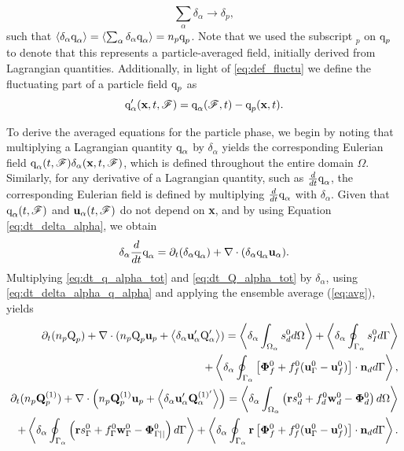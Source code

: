 \begin{equation*}
    \sum_\alpha \delta_\alpha \to \delta_p, 
\end{equation*}
such that $\left<\delta_\alpha \text q_\alpha\right>=\left<\sum_\alpha \delta_\alpha \text q_\alpha\right>=n_p\text q_p$.
Note that we used the subscript $_p$ on $\text q_p$ to denote that this represents a particle-averaged field, initially derived from Lagrangian quantities. 
Additionally, in light of \ref{eq:def_fluctu} we define the fluctuating part of a particle field $\text q_p$ as
\begin{equation}
    \text q_\alpha'(\textbf{x},t,\FF) = \text q_\alpha(\FF,t) - \text q_p(\textbf{x},t). 
    \label{eq:def_fluc_p}
\end{equation}

To derive the averaged equations for the particle phase, we begin by noting that multiplying a Lagrangian quantity $\text q_\alpha$ by $\delta_\alpha$ yields the corresponding Eulerian field  $\text q_\alpha(t,\mathscr{F})\delta_\alpha(\textbf{x},t,\mathscr{F})$, which is defined throughout the entire domain $\Omega$. 
Similarly, for any derivative of a Lagrangian quantity, such as $\frac{d}{dt} \text q_\alpha$, the corresponding Eulerian field is defined by multiplying $\frac{d}{dt} \text q_\alpha$ with $\delta_\alpha$.
Given that $\text q_\alpha(t,\mathscr{F})$ and $\textbf{u}_\alpha(t,\mathscr{F})$ do not depend on \textbf{x}, and by using Equation \ref{eq:dt_delta_alpha}, we obtain
\begin{equation}
    \delta_\alpha \ddt \text q_\alpha
    = \pddt (\delta_\alpha \text q_\alpha)
    + \div (\delta_\alpha \text q_\alpha \textbf{u}_\alpha).
    \label{eq:dt_delta_alpha_q_alpha}
\end{equation}
Multiplying \ref{eq:dt_q_alpha_tot} and \ref{eq:dt_Q_alpha_tot} by $\delta_\alpha$, using \ref{eq:dt_delta_alpha_q_alpha} and applying the ensemble average (\ref{eq:avg}), yields
\begin{align}
    \pddt (n_p\text Q_p)
    + \div (n_p \text Q_p \textbf{u}_p + \pavg{\textbf{u}_\alpha' \text Q_\alpha'})
    = \pOavg{ s_d^0 }
    + \pSavg{ s_I^0 }\nonumber\\
    + \pSavg{ \left[\mathbf{\Phi}_f^0 + f_f^0 (\textbf{u}_\Gamma^0-\textbf{u}_f^0) \right] \cdot \textbf{n}_d },
    \label{eq:avg_dt_dq_alpha_tot}\\
    \pddt (n_p\textbf{Q}_p^{(1)})
    + \div \left(n_p \textbf{Q}_p^{(1)} \textbf{u}_p + \pavg{\textbf{u}_\alpha' \textbf{Q}_\alpha^{(1)'}}\right)
    =\pOavg{ \left(
        \textbf{r} s_d^0         
        + f_d^0  \textbf{w}_d^0 
        - \mathbf{\Phi}_d^0
    \right) }\nonumber\\
    + \pSavg{ \left(
        \textbf{r}s_\Gamma^0
        + f_\Gamma^0 \textbf{w}_\Gamma^0
        - \mathbf{\Phi}_{\Gamma||}^0
    \right) }
    + \pSavg{ \textbf{r} \left[
        \mathbf{\Phi}_f^0
        + f_f^0 (\textbf{u}_\Gamma^0-\textbf{u}_f^0)
    \right]\cdot \textbf{n}_d  }.
    \label{eq:avg_dt_dQ_alpha_tot}
\end{align}
